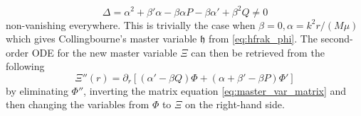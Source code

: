 \documentclass[11pt,aip,jmp,amsmath,amssymb,draft]{revtex4-1}
\begin{document}
\begin{equation}
    \Delta = \alpha^2 + \beta'\alpha - \beta\alpha P - \beta\alpha' + \beta^2 Q \ne 0
\end{equation}
non-vanishing everywhere.
This is trivially the case when $\beta =0, \alpha = k^2 r/(M\mu)$ which gives Collingbourne's master variable $\mathfrak{h}$ from \cref{eq:hfrak_phi}.
The second-order ODE for the new master variable $\Xi$ can then be retrieved from the following
\begin{equation} \label{eq:master_var_ODE}
    \Xi''(r) = \partial_r[ (\alpha' - \beta Q)\Phi + (\alpha + \beta' - \beta P)\Phi']
\end{equation}
by eliminating $\Phi''$, inverting the matrix equation \cref{eq:master_var_matrix} and then changing the variables from $\Phi$ to $\Xi$ on the right-hand side.


\end{document}
